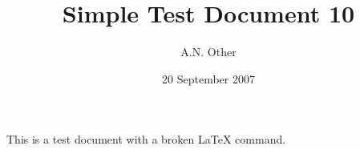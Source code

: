 \documentclass{article}
\date{20 September 2007}
\author{A.N. Other}
\title{Simple Test Document 10}
\begin{document}
\maketitleXXX

This is a test document with a broken LaTeX command.
\end{document}
